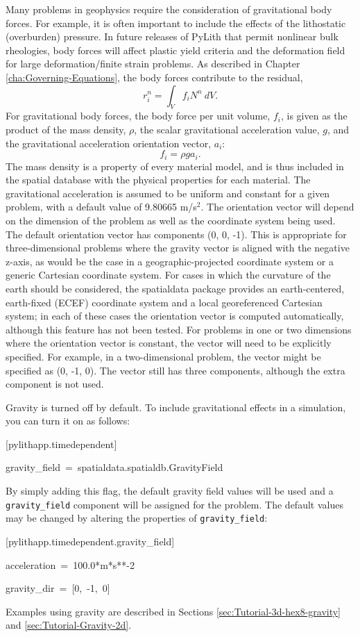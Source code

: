 Many problems in geophysics require the consideration of gravitational
body forces. For example, it is often important to include the effects
of the lithostatic (overburden) pressure. In future releases of PyLith
that permit nonlinear bulk rheologies, body forces will affect plastic
yield criteria and the deformation field for large deformation/finite
strain problems. As described in Chapter \ref{cha:Governing-Equations},
the body forces contribute to the residual,
\begin{equation}
r_{i}^{n}=\int_{V}f_{i}N^{n}\: dV.
\end{equation}
For gravitational body forces, the body force per unit volume, $f_{i}$,
is given as the product of the mass density, $\rho$, the scalar gravitational
acceleration value, $g$, and the gravitational acceleration orientation
vector, $a_{i}$:
\begin{equation}
f_{i}=\rho ga_{i}.
\end{equation}
The mass density is a property of every material model, and is thus
included in the spatial database with the physical properties for
each material. The gravitational acceleration is assumed to be uniform
and constant for a given problem, with a default value of 9.80665
m/s$^{\text{2}}$. The orientation vector will depend on the dimension
of the problem as well as the coordinate system being used. The default
orientation vector has components (0, 0, -1). This is appropriate
for three-dimensional problems where the gravity vector is aligned
with the negative z-axis, as would be the case in a geographic-projected
coordinate system or a generic Cartesian coordinate system. For cases
in which the curvature of the earth should be considered, the spatialdata
package provides an earth-centered, earth-fixed (ECEF) coordinate
system and a local georeferenced Cartesian system; in each of these
cases the orientation vector is computed automatically, although this
feature has not been tested. For problems in one or two dimensions
where the orientation vector is constant, the vector will need to
be explicitly specified. For example, in a two-dimensional problem,
the vector might be specified as (0, -1, 0). The vector still has
three components, although the extra component is not used.

Gravity is turned off by default. To include gravitational effects
in a simulation, you can turn it on as follows:
\begin{lyxcode}
{[}pylithapp.timedependent{]}

gravity\_field~=~spatialdata.spatialdb.GravityField
\end{lyxcode}
By simply adding this flag, the default gravity field values will
be used and a \texttt{gravity\_field} component will be assigned for
the problem. The default values may be changed by altering the properties
of \texttt{gravity\_field}:
\begin{lyxcode}
{[}pylithapp.timedependent.gravity\_field{]}

acceleration~=~100.0{*}m{*}s{*}{*}-2

gravity\_dir~=~{[}0,~-1,~0{]}
\end{lyxcode}
Examples using gravity are described in Sections \ref{sec:Tutorial-3d-hex8-gravity}
and \ref{sec:Tutorial-Gravity-2d}.
